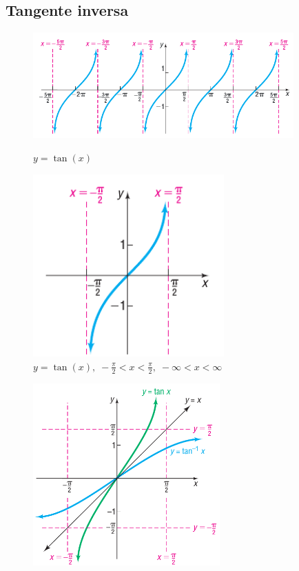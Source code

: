 \subsection{Tangente inversa}
{}
	\begin{figure}
		\centering
		\includegraphics[width=10cm,keepaspectratio=true]{./trig/sull0712.png}
		\label{fig:0712}
		\caption{$y=\tan(x)$}
	\end{figure}
	

{}
	\begin{figure}
		\centering
		\includegraphics[height=7cm,keepaspectratio=true]{./trig/sull0713.png}
		\caption{$y=\tan(x), \; -\frac{\pi}{2}<x<\frac{\pi}{2}, \; 
			-\infty < x < \infty$}
		\label{fig:0713}
	\end{figure}
	

{}
	\begin{figure}
		\centering
		\includegraphics[height=7cm,keepaspectratio=true]{./trig/sull0714.png}
		\label{fig:0714}
	\end{figure}
	

